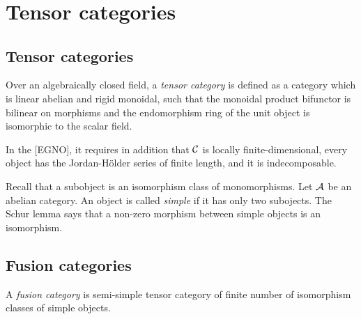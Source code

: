 \documentclass{../../large}
\begin{document}
\begin{prb}
\end{prb}


\[\begin{tikzcd}[sep=small]
\end{tikzcd}\]


\chapter{Tensor categories}





\section{Tensor categories}



\begin{prb}
Over an algebraically closed field, a \emph{tensor category} is defined as a category which is linear abelian and rigid monoidal, such that the monoidal product bifunctor is bilinear on morphisms and the endomorphism ring of the unit object is isomorphic to the scalar field.

In the [EGNO], it requires in addition that $\mathcal{C}$ is locally finite-dimensional, every object has the Jordan-H\"older series of finite length, and it is indecomposable.
\end{prb}


\begin{prb}
Recall that a subobject is an isomorphism class of monomorphisms.
Let $\mathcal{A}$ be an abelian category.
An object is called \emph{simple} if it has only two subojects.
The Schur lemma says that a non-zero morphism between simple objects is an isomorphism.
\end{prb}


\section{Fusion categories}

\begin{prb}

A \emph{fusion category} is semi-simple tensor category of finite number of isomorphism classes of simple objects.

\end{prb}
\end{document}
